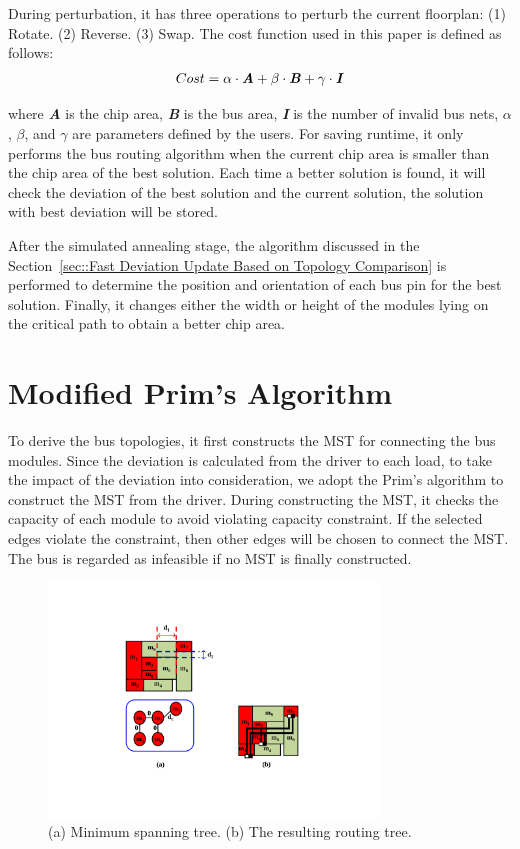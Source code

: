 During perturbation, it has three operations to
perturb the current floorplan: (1) Rotate. (2) Reverse. (3) Swap.
The cost function used in this paper is defined as follows:
\begin{eqnarray}
Cost = \alpha \cdot \textbf{\textit{A}} + \beta \cdot
\textbf{\textit{B}} + \gamma \cdot \textbf{\textit{I}}
\end{eqnarray}

where \textbf{\textit{A}} is the chip area, \textbf{\textit{B}} is
the bus area, \textbf{\textit{I}} is the number of invalid bus nets,
$\alpha$, $\beta$, and $\gamma$ are parameters defined by the users.
For saving runtime, it only performs the bus routing algorithm when
the current chip area is smaller than the chip area of the best solution.
Each time a better solution is found, it will check the deviation of
the best solution and the current solution, the solution
with best deviation will be stored.

After the simulated annealing stage, the algorithm discussed in
the Section~\ref{sec::Fast Deviation Update Based on Topology Comparison} is performed to
determine the position and orientation of each bus pin for the best solution. Finally, it changes either the
width or height of the modules lying on the critical path to obtain
a better chip area.

\section{Modified Prim's Algorithm} \label{sec::Modified Prims Algorithm}
To derive the bus topologies, it first constructs the MST for connecting the
bus modules. Since the deviation is calculated from the driver to each load,
to take the impact of the deviation into consideration,
we adopt the Prim's algorithm to construct the MST from
the driver. During constructing the MST, it checks the capacity
of each module to avoid violating capacity constraint. If the selected
edges violate the constraint, then other edges will be chosen to
connect the MST. The bus is regarded as infeasible if no MST is finally
constructed.

\begin{figure}[htb]
  \centering
    \includegraphics[width=8.8cm]{Fig/MST.pdf}
     \caption{
       (a) Minimum spanning tree. (b) The resulting routing tree.
   }
  \label{fig::minimum_spanning_tree}
\end{figure}

